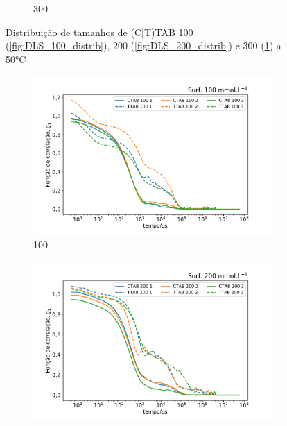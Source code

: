 \begin{figure}[H]
\begin{subfigure}{0.3\textwidth}
		\caption{300\mM}
		\label{fig:DLS_300_distrib}
	\end{subfigure}
	\caption{Distribuição de tamanhos de (C|T)TAB 100 (\ref{fig:DLS_100_distrib}), 200 (\ref{fig:DLS_200_distrib}) e 300 (\ref{fig:DLS_300_distrib}) \mM{} a 50°C}
	\label{fig:DLS_distrib_conc}
\end{figure}

\begin{figure}[H]
	\begin{subfigure}{0.3\textwidth}
		\centering
		\includegraphics[width=\textwidth]{imagens/dls/100_CC}
		\caption{100\mM}
		\label{fig:DLS_100_CC}
	\end{subfigure} %
	\begin{subfigure}{0.3\textwidth}
		\centering
		\includegraphics[width=\textwidth]{imagens/dls/200_CC}

\end{subfigure}
\end{figure}
